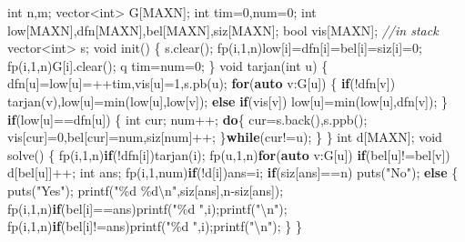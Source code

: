 \documentclass[
]{article}
\newenvironment{Shaded}{}{}
\newcommand{\CommentTok}[1]{\textcolor[rgb]{0.38,0.63,0.69}{\textit{#1}}}
\newcommand{\ControlFlowTok}[1]{\textcolor[rgb]{0.00,0.44,0.13}{\textbf{#1}}}
\newcommand{\DataTypeTok}[1]{\textcolor[rgb]{0.56,0.13,0.00}{#1}}
\newcommand{\DecValTok}[1]{\textcolor[rgb]{0.25,0.63,0.44}{#1}}
\newcommand{\KeywordTok}[1]{\textcolor[rgb]{0.00,0.44,0.13}{\textbf{#1}}}
\newcommand{\NormalTok}[1]{#1}
\newcommand{\SpecialCharTok}[1]{\textcolor[rgb]{0.25,0.44,0.63}{#1}}
\newcommand{\StringTok}[1]{\textcolor[rgb]{0.25,0.44,0.63}{#1}}
\begin{document}
\begin{Shaded}
\begin{Highlighting}[]
\DataTypeTok{int}\NormalTok{ n,m;}
\NormalTok{vector\textless{}}\DataTypeTok{int}\NormalTok{\textgreater{} G[MAXN];}
\DataTypeTok{int}\NormalTok{ tim=}\DecValTok{0}\NormalTok{,num=}\DecValTok{0}\NormalTok{;}
\DataTypeTok{int}\NormalTok{ low[MAXN],dfn[MAXN],bel[MAXN],siz[MAXN];}
\DataTypeTok{bool}\NormalTok{ vis[MAXN]; }\CommentTok{//in stack}
\NormalTok{vector\textless{}}\DataTypeTok{int}\NormalTok{\textgreater{} s;}
\DataTypeTok{void}\NormalTok{ init()}
\NormalTok{\{}
\NormalTok{    s.clear();}
\NormalTok{    fp(i,}\DecValTok{1}\NormalTok{,n)low[i]=dfn[i]=bel[i]=siz[i]=}\DecValTok{0}\NormalTok{;}
\NormalTok{    fp(i,}\DecValTok{1}\NormalTok{,n)G[i].clear(); q}
\NormalTok{    tim=num=}\DecValTok{0}\NormalTok{;}
\NormalTok{\}}
\DataTypeTok{void}\NormalTok{ tarjan(}\DataTypeTok{int}\NormalTok{ u)}
\NormalTok{\{}
\NormalTok{    dfn[u]=low[u]=++tim,vis[u]=}\DecValTok{1}\NormalTok{,s.pb(u);    }
    \ControlFlowTok{for}\NormalTok{(}\KeywordTok{auto}\NormalTok{ v:G[u])}
\NormalTok{    \{}
        \ControlFlowTok{if}\NormalTok{(!dfn[v]) tarjan(v),low[u]=min(low[u],low[v]);}
        \ControlFlowTok{else} \ControlFlowTok{if}\NormalTok{(vis[v]) low[u]=min(low[u],dfn[v]);}
\NormalTok{    \}}
    \ControlFlowTok{if}\NormalTok{(low[u]==dfn[u])}
\NormalTok{    \{}
        \DataTypeTok{int}\NormalTok{ cur; num++;}
        \ControlFlowTok{do}\NormalTok{\{}
\NormalTok{            cur=s.back(),s.ppb();}
\NormalTok{            vis[cur]=}\DecValTok{0}\NormalTok{,bel[cur]=num,siz[num]++;}
\NormalTok{        \}}\ControlFlowTok{while}\NormalTok{(cur!=u);}
\NormalTok{    \}}
\NormalTok{\}}
\DataTypeTok{int}\NormalTok{ d[MAXN];}
\DataTypeTok{void}\NormalTok{ solve()}
\NormalTok{\{}
\NormalTok{    fp(i,}\DecValTok{1}\NormalTok{,n)}\ControlFlowTok{if}\NormalTok{(!dfn[i])tarjan(i);}
\NormalTok{    fp(u,}\DecValTok{1}\NormalTok{,n)}\ControlFlowTok{for}\NormalTok{(}\KeywordTok{auto}\NormalTok{ v:G[u])}
        \ControlFlowTok{if}\NormalTok{(bel[u]!=bel[v])}
\NormalTok{            d[bel[u]]++;}
    \DataTypeTok{int}\NormalTok{ ans;}
\NormalTok{    fp(i,}\DecValTok{1}\NormalTok{,num)}\ControlFlowTok{if}\NormalTok{(!d[i])ans=i;}
    \ControlFlowTok{if}\NormalTok{(siz[ans]==n) puts(}\StringTok{"No"}\NormalTok{);}
    \ControlFlowTok{else}
\NormalTok{    \{}
\NormalTok{        puts(}\StringTok{"Yes"}\NormalTok{);}
\NormalTok{        printf(}\StringTok{"}\SpecialCharTok{\%d}\StringTok{ }\SpecialCharTok{\%d\textbackslash{}n}\StringTok{"}\NormalTok{,siz[ans],n{-}siz[ans]);}
\NormalTok{        fp(i,}\DecValTok{1}\NormalTok{,n)}\ControlFlowTok{if}\NormalTok{(bel[i]==ans)printf(}\StringTok{"}\SpecialCharTok{\%d}\StringTok{ "}\NormalTok{,i);printf(}\StringTok{"}\SpecialCharTok{\textbackslash{}n}\StringTok{"}\NormalTok{);}
\NormalTok{        fp(i,}\DecValTok{1}\NormalTok{,n)}\ControlFlowTok{if}\NormalTok{(bel[i]!=ans)printf(}\StringTok{"}\SpecialCharTok{\%d}\StringTok{ "}\NormalTok{,i);printf(}\StringTok{"}\SpecialCharTok{\textbackslash{}n}\StringTok{"}\NormalTok{);}
\NormalTok{    \}}
\NormalTok{\}}
\end{Highlighting}
\end{Shaded}
\end{document}
